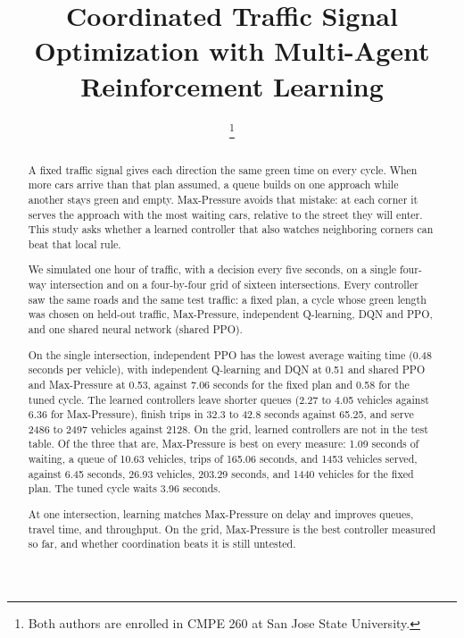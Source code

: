 \documentclass[conference]{IEEEtran}
\begin{document}
\title{Coordinated Traffic Signal Optimization with Multi-Agent Reinforcement Learning}

\author{
\and
{}
\thanks{Both authors are enrolled in CMPE 260 at San Jose State University.}
}

\maketitle

\begin{abstract}
A fixed traffic signal gives each direction the same green time on every cycle. When more cars arrive than that plan assumed, a queue builds on one approach while another stays green and empty. Max-Pressure avoids that mistake: at each corner it serves the approach with the most waiting cars, relative to the street they will enter. This study asks whether a learned controller that also watches neighboring corners can beat that local rule.

We simulated one hour of traffic, with a decision every five seconds, on a single four-way intersection and on a four-by-four grid of sixteen intersections. Every controller saw the same roads and the same test traffic: a fixed plan, a cycle whose green length was chosen on held-out traffic, Max-Pressure, independent Q-learning, DQN and PPO, and one shared neural network (shared PPO).

On the single intersection, independent PPO has the lowest average waiting time (0.48 seconds per vehicle), with independent Q-learning and DQN at 0.51 and shared PPO and Max-Pressure at 0.53, against 7.06 seconds for the fixed plan and 0.58 for the tuned cycle. The learned controllers leave shorter queues (2.27 to 4.05 vehicles against 6.36 for Max-Pressure), finish trips in 32.3 to 42.8 seconds against 65.25, and serve 2486 to 2497 vehicles against 2128. On the grid, learned controllers are not in the test table. Of the three that are, Max-Pressure is best on every measure: 1.09 seconds of waiting, a queue of 10.63 vehicles, trips of 165.06 seconds, and 1453 vehicles served, against 6.45 seconds, 26.93 vehicles, 203.29 seconds, and 1440 vehicles for the fixed plan. The tuned cycle waits 3.96 seconds.

At one intersection, learning matches Max-Pressure on delay and improves queues, travel time, and throughput. On the grid, Max-Pressure is the best controller measured so far, and whether coordination beats it is still untested.
\end{abstract}
\end{document}
